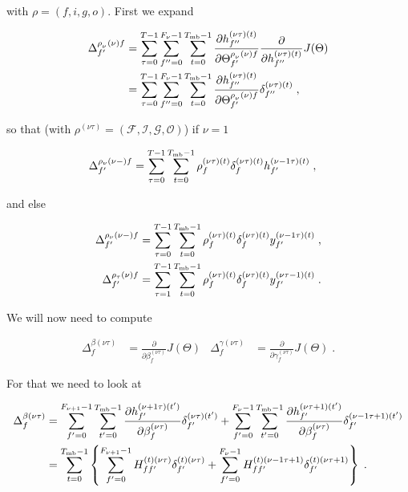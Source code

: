 \begin{subappendices}
with $\rho = (f,i,g,o)$. First we expand

\begin{align}
\Delta^{\rho_{_\nu}(\nu)f}_{f'}&=\sum_{\tau=0}^{T-1}\sum_{f''=0}^{F_\nu-1}\sum_{t=0}^{T_{{\rm mb}}-1}
%
\frac{\partial h^{(\nu\tau)(t)}_{f''}}{\partial \Theta^{\rho_{_\nu}(\nu)f}_{f'}}
%
\frac{\partial}{\partial h^{(\nu\tau)(t)}_{f''}} J(\Theta)\notag\\
%
&=\sum_{\tau=0}^{T-1}\sum_{f''=0}^{F_\nu-1}\sum_{t=0}^{T_{{\rm mb}}-1}
%
\frac{\partial h^{(\nu\tau)(t)}_{f''}}{\partial \Theta^{\rho_{_\nu}(\nu)f}_{f'}}
%
\delta^{(\nu\tau)(t)}_{f''}\;,
\end{align}

so that (with $\rho^{(\nu\tau)}=\left(\mathcal{F},\mathcal{I},\mathcal{G},\mathcal{O}\right)$) if $\nu=1$

\begin{align}
\Delta^{\rho_\nu(\nu-)f}_{f'}&=\sum_{\tau=0}^{T-1}\sum_{t=0}^{T_{{\rm mb}}-1}
%
\rho^{(\nu\tau)(t)}_{f}\delta^{(\nu\tau)(t)}_{f}h^{(\nu-1\tau)(t)}_{f'}\;,
\end{align}

and else

\begin{align}
\Delta^{\rho_\nu(\nu-)f}_{f'}&=\sum_{\tau=0}^{T-1}\sum_{t=0}^{T_{{\rm mb}}-1}
%
\rho^{(\nu\tau)(t)}_{f}\delta^{(\nu\tau)(t)}_{f}y^{(\nu-1\tau)(t)}_{f'}\;,\\
%
\Delta^{\rho_\tau(\nu)f}_{f'}&=\sum_{\tau=1}^{T-1}\sum_{t=0}^{T_{{\rm mb}}-1}
%
\rho^{(\nu\tau)(t)}_{f}\delta^{(\nu\tau)(t)}_{f}y^{(\nu\tau-1)(t)}_{f'}\;.
\end{align}

We will now need to compute

\begin{align}
\Delta^{\beta(\nu\tau)}_{f}&=\frac{\partial}{\partial \beta^{(\nu\tau)}_f} J(\Theta)&
%
\Delta^{\gamma(\nu\tau)}_{f}&=\frac{\partial}{\partial \gamma^{(\nu\tau)}_f} J(\Theta)\;.
\end{align}

For that we need to look at

\begin{align}
\Delta^{\beta(\nu\tau)}_{f}&=\sum_{f'=0}^{F_{\nu+1}-1}\sum_{t'=0}^{T_{{\rm mb}}-1}
%
\frac{\partial h^{(\nu+1\tau)(t')}_{f'}}{\partial \beta^{(\nu\tau)}_f}\delta^{(\nu\tau)(t')}_{f'}
%
+\sum_{f'=0}^{F_{\nu}-1}\sum_{t'=0}^{T_{{\rm mb}}-1}\frac{\partial h^{(\nu\tau+1)(t')}_{f'}}
%
{\partial \beta^{(\nu\tau)}_f}\delta^{(\nu-1\tau+1)(t')}_{f'}\notag\\
%
&=\sum_{t=0}^{T_{{\rm mb}}-1}\left\{\sum_{f'=0}^{F_{\nu+1}-1}
%
H^{(t)(\nu\tau)}_{ff'}\delta^{(t)(\nu\tau)}_{f'}
%
+\sum_{f'=0}^{F_{\nu}-1}H^{(t)(\nu-1\tau+1)}_{ff'}\delta^{(t)(\nu\tau+1)}_{f'}\right\}\;.
\end{align}


\end{subappendices}
